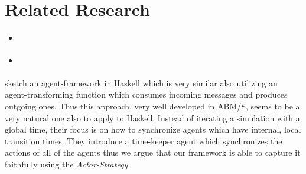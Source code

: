 \section{Related Research}
\begin{itemize}
	\item \cite{huberman_evolutionary_1993}
	\item \cite{a_framework_2008}
\end{itemize} 

\cite{botta_time_2010} sketch an agent-framework in Haskell which is very similar also utilizing an agent-transforming function which consumes incoming messages and produces outgoing ones. Thus this approach, very well developed in ABM/S, seems to be a very natural one also to apply to Haskell. Instead of iterating a simulation with a global time, their focus is on how to synchronize agents which have internal, local transition times. They introduce a time-keeper agent which synchronizes the actions of all of the agents thus we argue that our framework is able to capture it faithfully using the \textit{Actor-Strategy}.